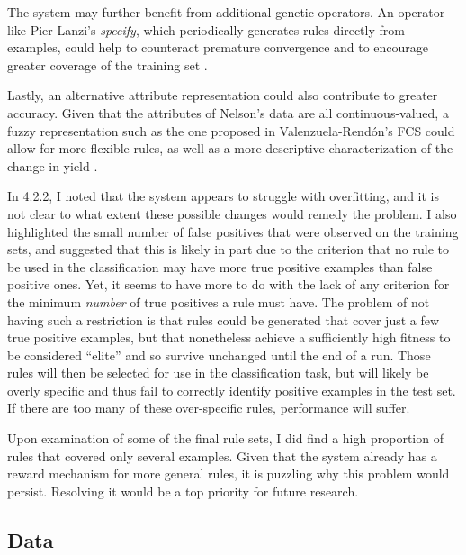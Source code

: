 \documentclass[12pt,twoside]{article}
\begin{document}
The system may further benefit from additional genetic operators. An operator like Pier Lanzi's \emph{specify}, which periodically generates rules directly from examples, could help to counteract premature convergence and to encourage greater coverage of the training set \cite{lanzi_study_1997}.

Lastly, an alternative attribute representation could also contribute to greater accuracy. Given that the attributes of Nelson's data are all continuous-valued, a fuzzy representation such as the one proposed in 
Valenzuela-Rend\'on's FCS could allow for more flexible rules, as well as a more descriptive characterization of the change in yield \cite{manuel_valenzuela-rendon_fuzzy_1991}.

In 4.2.2, I noted that the system appears to struggle with overfitting, and it is not clear to what extent these possible changes would remedy the problem. I also highlighted the small number of false positives that were observed on the training sets, and suggested that this is likely in part due to the criterion that no rule to be used in the classification may have more true positive examples than false positive ones. Yet, it seems to have more to do with the lack of any criterion for the minimum \emph{number} of true positives a rule must have. The problem of not having such a restriction is that rules could be generated that cover just a few true positive examples, but that nonetheless achieve a sufficiently high fitness to be considered ``elite'' and so survive unchanged until the end of a run. Those rules will then be selected for use in the classification task, but will likely be overly specific and thus fail to correctly identify positive examples in the test set. If there are too many of these over-specific rules, performance will suffer.

Upon examination of some of the final rule sets, I did find a high proportion of rules that covered only several examples. Given that the system already has a reward mechanism for more general rules, it is puzzling why this problem would persist. Resolving it would be a top priority for future research.

\subsection{Data}
\end{document}
